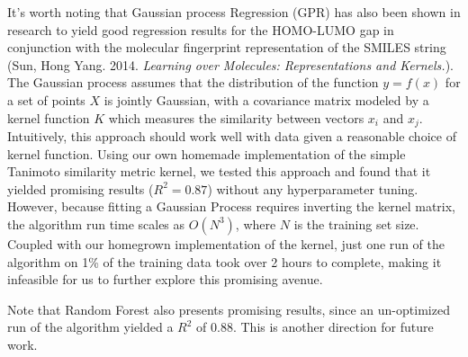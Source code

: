 \documentclass[12pt]{article}
\begin{document}
It's worth noting that Gaussian process Regression (GPR) has also been shown in research to yield good regression results for the HOMO-LUMO gap in conjunction with the molecular fingerprint representation of the SMILES string (Sun, Hong Yang. 2014. \textit{Learning over Molecules: Representations and Kernels.}). The Gaussian process assumes that the distribution of the function $y = f(x)$ for a set of points $X$ is jointly Gaussian, with a covariance matrix modeled by a kernel function $K$ which measures the similarity between vectors $x_i$ and $x_j$. Intuitively, this approach should work well with data given a reasonable choice of kernel function. Using our own homemade implementation of the simple Tanimoto similarity metric kernel, we tested this approach and found that it yielded promising results ($R^2 = 0.87$) without any hyperparameter tuning. However, because fitting a Gaussian Process requires inverting the kernel matrix, the algorithm run time scales as $O(N^3)$, where $N$ is the training set size. Coupled with our homegrown implementation of the kernel, just one run of the algorithm on 1\% of the training data took over 2 hours to complete, making it infeasible for us to further explore this promising avenue.

Note that Random Forest also presents promising results, since an un-optimized run of the algorithm yielded a $R^2$ of 0.88. This is another direction for future work.
\end{document}
